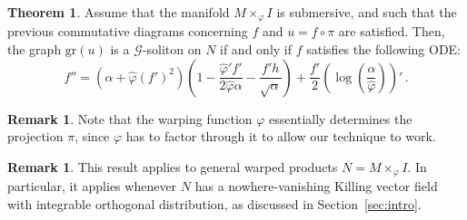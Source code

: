 \documentclass[oneside,12pt]{amsart}
\theoremstyle{definition}
\newtheorem{theorem}[lemma]{Theorem}
\newtheorem{remark}[lemma]{Remark}
\newcommand{\R}{\mathbb{R}}
\begin{document}
\begin{theorem} \label{thm:ode}
%
Assume that the manifold $M\times_{\varphi}I$ is submersive, and such that the previous commutative diagrams concerning $f$ and $u=f\circ\pi$ are satisfied. Then, the graph $\mathrm{gr}(u)$  is a $\mathcal{G}$-soliton on $N$ if and only if $f$ satisfies the following ODE:
\begin{equation}\label{eq:ode}
        f''=\left(\alpha+\widehat{\varphi}(f')^2\right)\left( 1-\frac{\widehat{\varphi}'f'}{ 2\widehat{\varphi}\alpha} - \frac{f'h}{\sqrt{\alpha}}\right)
+\frac{f'}{2}\left(\log\left(\frac{\alpha}{\widehat{\varphi}}\right)\right)' \, .
\end{equation}
\end{theorem}

\begin{remark} Note that the warping function $\varphi$ essentially determines the projection $\pi$, since $\varphi$ has to factor through it to allow our technique to work. 
\end{remark}
\begin{remark} This result applies to general warped products $N = M \times_{\varphi} I$. In particular, it applies whenever $N$ has a nowhere-vanishing Killing vector field with integrable orthogonal distribution, as discussed in Section~\ref{sec:intro}.
\end{remark}
\end{document}
